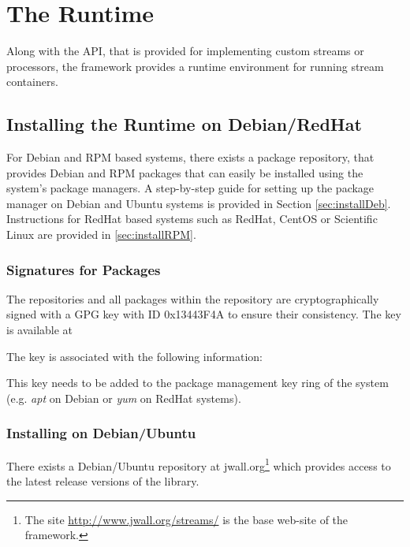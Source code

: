 \section{\label{sec:streamsRuntime}The \streams Runtime}
Along with the \streams API, that is provided for implementing custom
streams or processors, the \streams framework provides a runtime
environment for running stream containers.

\subsection{Installing the \streams Runtime on Debian/RedHat}
For Debian and RPM based systems, there exists a package repository,
that provides Debian and RPM packages that can easily be installed
using the system's package managers. A step-by-step guide for setting
up the package manager on Debian and Ubuntu systems is provided in
Section \ref{sec:installDeb}. Instructions for RedHat based systems
such as RedHat, CentOS or Scientific Linux are provided in
\ref{sec:installRPM}.


\subsubsection{\label{sec:gpgKey}Signatures for Packages}
The repositories and all packages within the repository are
cryptographically signed with a GPG key with ID {\ttfamily 0x13443F4A}
to ensure their consistency. The key is available at


The key is associated with the following information:


This key needs to be added to the package management key ring of the
system (e.g. {\em apt} on Debian or {\em yum} on RedHat systems).

\subsubsection{\label{sec:installDeb}Installing on Debian/Ubuntu}
There exists a Debian/Ubuntu repository at {\ttfamily
  jwall.org}\footnote{The site \url{http://www.jwall.org/streams/} is
  the base web-site of the \streams framework.} which provides access
to the latest release versions of the \streams library.

